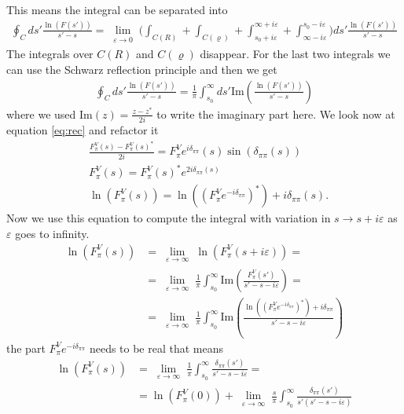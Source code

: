\documentclass[a4paper]{article}
\begin{document}
This means the integral can be separated into
\begin{align}
    \oint_C ds' \frac{\ln(F(s'))}{s'-s} =
    \lim_{\substack{\varepsilon \rightarrow 0}}
    \bigg(
    \int_{C(R)} + \int_{C(\varrho)} + \int_{s_0+i\varepsilon}^{\infty
    +i\varepsilon} +  \int^{s_0-i\varepsilon}_{\infty
    -i\varepsilon}
    \bigg) ds' \frac{\ln(F(s'))}{s'-s}
\end{align}
The integrals over $C(R)$ and $C(\varrho)$ disappear. For the last two
integrals we can use the Schwarz reflection principle and then we get
\begin{align}
    \oint_C ds' \frac{\ln(F(s'))}{s'-s} = \frac{1}{\pi} \int_{s_0}^{\infty}ds'
    \text{Im}\left(
    \frac{\ln(F(s'))}{s'-s}\right)
\end{align}
where we used $\text{Im}(z) = \frac{z - z^*}{2i}$ to write the imaginary part
here. We look now at equation \ref{eq:rec} and refactor it
\begin{align}
    &\frac{F_\pi^V(s)-F_\pi^V(s)^*}{2i} = F_\pi^V e^{i\delta_{\pi\pi}}(s)
    \sin(\delta_{\pi\pi}(s)) \\
    &F_\pi^V(s) = F_\pi^V(s)^* e^{2i \delta_{\pi\pi}(s)}\\
    &\ln(F_\pi^V(s)) = \ln((F_\pi^V e^{-i\delta_{\pi\pi}})^*)+
    i\delta_{\pi\pi}(s).\label{eq:use}
\end{align}
Now we use this equation to compute the integral with variation in $s
\rightarrow s+i\varepsilon$ as $\varepsilon$ goes to infinity.
\begin{align}
    \ln(F_\pi^V(s)) &= \lim_{\substack{\varepsilon \rightarrow \infty}}
    \ln(F_\pi^V(s+i\varepsilon)) = \\
    &= \lim_{\substack{\varepsilon \rightarrow \infty}}\frac{1}{\pi}
    \int_{s_0}^{\infty}
    \text{Im}\left(\frac{F_\pi^V(s')}{s'-s-i\varepsilon}\right)=\\
    &=\lim_{\substack{\varepsilon \rightarrow \infty}}\frac{1}{\pi}
    \int_{s_0}^{\infty}
    \text{Im}\left(\frac{\ln((F_\pi^V e^{-i\delta_{\pi\pi}})^*)+
    i\delta_{\pi\pi}}{s'-s-i\varepsilon}\right)
\end{align}
the part $F_\pi^V e^{-i\delta_{\pi\pi}}$ needs to be real that means
\begin{align}
    \ln(F_\pi^V(s)) &= \lim_{\substack{\varepsilon \rightarrow \infty}}\frac{1}{\pi}
    \int_{s_0}^{\infty}
    \frac{\delta_{\pi\pi}(s')}{s'-s-i\varepsilon} =\\
    &= \ln(F_\pi^V(0)) + \lim_{\substack{\varepsilon \rightarrow \infty}}
    \frac{s}{\pi}
    \int_{s_0}^{\infty}
    \frac{\delta_{\pi\pi}(s')}{s'(s'-s-i\varepsilon)}
\end{align}
\end{document}
